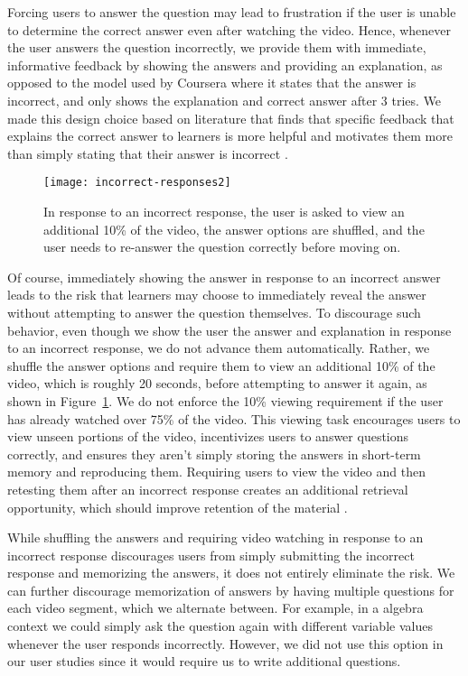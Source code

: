 \documentclass{sigchi}
\begin{document}
Forcing users to answer the question may lead to frustration if the user is unable to determine the correct answer even after watching the video. Hence, whenever the user answers the question incorrectly, we provide them with immediate, informative feedback by showing the answers and providing an explanation, as opposed to the model used by Coursera where it states that the answer is incorrect, and only shows the explanation and correct answer after 3 tries. We made this design choice based on literature that finds that specific feedback that explains the correct answer to learners is more helpful and motivates them more than simply stating that their answer is incorrect \cite{formativefeedback}.

\begin{figure}
\centering
\texttt{[image: incorrect-responses2]}
\caption{In response to an incorrect response, the user is asked to view an additional 10\% of the video, the answer options are shuffled, and the user needs to re-answer the question correctly before moving on.}
\label{fig:figure2}
\end{figure}

Of course, immediately showing the answer in response to an incorrect answer leads to the risk that learners may choose to immediately reveal the answer without attempting to answer the question themselves. To discourage such behavior, even though we show the user the answer and explanation in response to an incorrect response, we do not advance them automatically. Rather, we shuffle the answer options and require them to view an additional 10\% of the video, which is roughly 20 seconds, before attempting to answer it again, as shown in Figure~\ref{fig:figure2}. We do not enforce the 10\% viewing requirement if the user has already watched over 75\% of the video. This viewing task encourages users to view unseen portions of the video, incentivizes users to answer questions correctly, and ensures they aren't simply storing the answers in short-term memory and reproducing them. Requiring users to view the video and then retesting them after an incorrect response creates an additional retrieval opportunity, which should improve retention of the material \cite{testingeffect}.

While shuffling the answers and requiring video watching in response to an incorrect response discourages users from simply submitting the incorrect response and memorizing the answers, it does not entirely eliminate the risk. We can further discourage memorization of answers by having multiple questions for each video segment, which we alternate between. For example, in a algebra context we could simply ask the question again with different variable values whenever the user responds incorrectly. However, we did not use this option in our user studies since it would require us to write additional questions.
\end{document}
